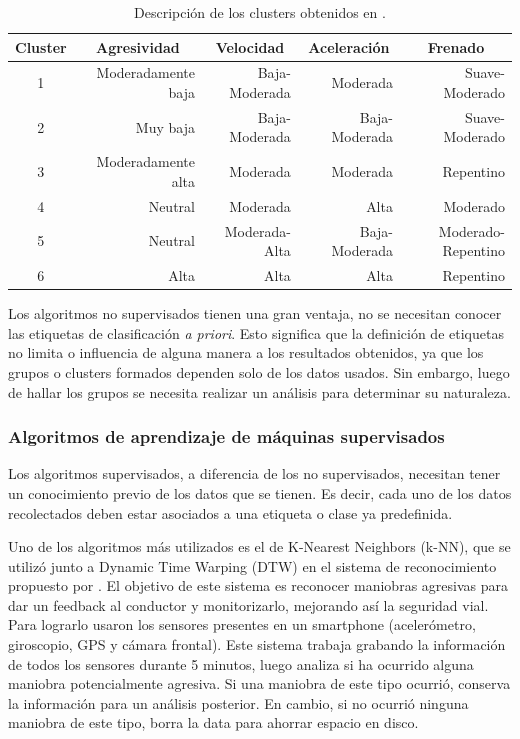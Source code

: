 \begin{table}[htbp!]
\centering
\caption[Descripción de los clusters obtenidos]{Descripción de los clusters obtenidos en \cite{constantinescu}.}
\begin{tabular}{crrrr}
\toprule
\multicolumn{1}{l}{\textbf{Cluster}} & \multicolumn{1}{c}{\textbf{Agresividad}} & \multicolumn{1}{c}{\textbf{Velocidad}} & \multicolumn{1}{c}{\textbf{Aceleración}} & \multicolumn{1}{c}{\textbf{Frenado}} \\ \midrule
1 & Moderadamente baja & Baja-Moderada & Moderada & Suave-Moderado \\
2 & Muy baja & Baja-Moderada & Baja-Moderada & Suave-Moderado \\
3 & Moderadamente alta & Moderada & Moderada & Repentino \\
4 & Neutral & Moderada & Alta & Moderado \\
5 & Neutral & Moderada-Alta & Baja-Moderada & Moderado-Repentino \\
6 & Alta & Alta & Alta & Repentino \\ \bottomrule
\end{tabular}
\label{diag:2.1}
\end{table}

Los algoritmos no supervisados tienen una gran ventaja, no se necesitan conocer las etiquetas de clasificación {\it a priori}. Esto significa que la definición de etiquetas no limita o influencia de alguna manera a los resultados obtenidos, ya que los grupos o clusters formados dependen solo de los datos usados. Sin embargo, luego de hallar los grupos se necesita realizar un análisis para determinar su naturaleza.

\subsubsection{Algoritmos de aprendizaje de máquinas supervisados}

Los algoritmos supervisados, a diferencia de los no supervisados, necesitan tener un conocimiento previo de los datos que se tienen. Es decir, cada uno de los datos recolectados deben estar asociados a una etiqueta o clase ya predefinida.

Uno de los algoritmos más utilizados es el de K-Nearest Neighbors (k-NN), que se utilizó junto a Dynamic Time Warping (DTW) en el sistema de reconocimiento propuesto por \citeauthor{6083078} \cite{6083078}. El objetivo de este sistema es reconocer maniobras agresivas para dar un feedback al conductor y monitorizarlo, mejorando así la seguridad vial. Para lograrlo usaron los sensores presentes en un smartphone (acelerómetro, giroscopio, GPS y cámara frontal). Este sistema trabaja grabando la información de todos los sensores durante 5 minutos, luego analiza si ha ocurrido alguna maniobra potencialmente agresiva. Si una maniobra de este tipo ocurrió, conserva la información para un análisis posterior. En cambio, si no ocurrió ninguna maniobra de este tipo, borra la data para ahorrar espacio en disco.

